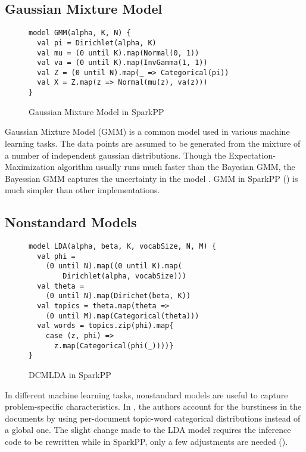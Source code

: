 \subsection{Gaussian Mixture Model}

\begin{figure}[!h]
\footnotesize
\begin{verbatim}
model GMM(alpha, K, N) {
  val pi = Dirichlet(alpha, K)
  val mu = (0 until K).map(Normal(0, 1))
  val va = (0 until K).map(InvGamma(1, 1))
  val Z = (0 until N).map(_ => Categorical(pi))
  val X = Z.map(z => Normal(mu(z), va(z)))
}
\end{verbatim}
\caption{Gaussian Mixture Model in SparkPP}
\label{fig:gmm_sparkpp}
\end{figure}

Gaussian Mixture Model (GMM) is a common model used in various machine
learning tasks. The data points are assumed to be generated from the mixture
of a number of independent gaussian distributions. Though the
Expectation-Maximization algorithm usually runs much faster than the Bayesian
GMM, the Bayessian GMM captures the uncertainty in the model . GMM in SparkPP () is much simpler than other
implementations.

\subsection{Nonstandard Models}

\begin{figure}[!h]
\footnotesize
\begin{verbatim}
model LDA(alpha, beta, K, vocabSize, N, M) {
  val phi = 
	(0 until N).map((0 until K).map(
		Dirichlet(alpha, vocabSize)))
  val theta = 
    (0 until N).map(Dirichet(beta, K))
  val topics = theta.map(theta => 
    (0 until M).map(Categorical(theta)))
  val words = topics.zip(phi).map{
	case (z, phi) => 
	  z.map(Categorical(phi(_))))}
}
\end{verbatim}
\caption{DCMLDA in SparkPP}
\label{fig:dcmlda_sparkpp}
\end{figure}

In different machine learning tasks, nonstandard models are useful to capture
problem-specific characteristics. In \cite{Doyle2009}, the authors account for
the burstiness in the documents by using per-document topic-word categorical
distributions instead of a global one. The slight change made to the LDA model
requires the inference code to be rewritten while in SparkPP, only a few
adjustments are needed ().

